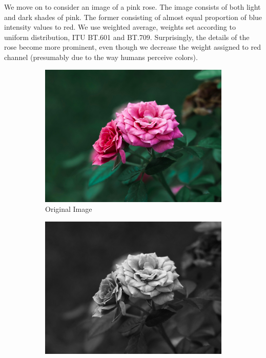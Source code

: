 \documentclass[a4paper]{article}
\begin{document}
We move on to consider an image of a pink rose. The image consists of both light and dark shades of pink. The former consisting of almost equal proportion of blue intensity values to red. We use weighted average, weights set according to uniform distribution, ITU BT.601 and BT.709. Surprisingly, the details of the rose become more prominent, even though we decrease the weight assigned to red channel (presumably due to the way humans perceive colors).

\begin{figure}[H]
    \hfill
    \centering
    \begin{subfigure}[b]{.225\textwidth}
        \centering
        \includegraphics[width=\textwidth]{media/rose.jpg}
        \caption{Original Image}
    \end{subfigure}
    \hfill
    \begin{subfigure}[b]{.225\textwidth}
        \centering
        \includegraphics[width=\textwidth]{output/rose_grayscale_33.jpg}

\end{subfigure}
\end{figure}
\end{document}

